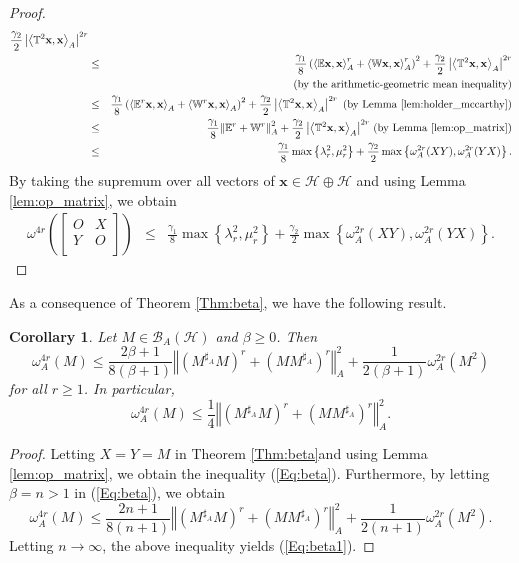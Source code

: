 \documentclass{article}
\newcommand{\bra}[1]{\left(#1\right)}
\newcommand{\seqA}[1]{{\left<#1\right>}_{A}}
\newcommand{\normA}[1]{{\left\Vert#1\right\Vert}_{A}}
\newcommand{\abs}[1]{\left\vert#1\right\vert}
\newcommand{\set}[1]{\left\{#1\right\}}
\newcommand{\hh}{\mathcal{H}\oplus\mathcal{H}}
\newcommand {\W}{\mathbb{W}}
\newcommand {\E}{\mathbb{E}}
\newcommand {\Ma}{M^{\sharp_{A}}}
\newcommand {\T}{\mathbb{T}}
\newcommand {\h}{\mathcal{H}}
\renewcommand {\b}{\mathcal{B}}
\newtheorem{corollary}[theorem]{Corollary}
\begin{document}
\begin{proof}
\begin{eqnarray*}
  \frac{\gamma_2}{2}\abs{\seqA{\T^2\mathbf{x},\mathbf{x}}}^{2r}\\
  &\leq& \frac{\gamma_1}{8}\bra{\seqA{\E\mathbf{x},\mathbf{x}}^{r}+\seqA{\W\mathbf{x},\mathbf{x}}^{r}}^2+
  \frac{\gamma_2}{2}\abs{\seqA{\T^2\mathbf{x},\mathbf{x}}}^{2r}\\
  &&\bra{\mbox{by the arithmetic-geometric mean inequality}}\\
  &\leq& \frac{\gamma_1}{8}\bra{\seqA{\E^r\mathbf{x},\mathbf{x}}
  +\seqA{\W^r\mathbf{x},\mathbf{x}}}^2+\frac{\gamma_2}{2}\abs{\seqA{\T^2\mathbf{x},\mathbf{x}}}^{2r}\,\,\bra{\mbox{by Lemma \ref{lem:holder_mccarthy}}}\\
   &\leq& \frac{\gamma_1}{8}\normA{\E^r+\W^r}^2+\frac{\gamma_2}{2}\abs{\seqA{\T^2\mathbf{x},\mathbf{x}}}^{2r}\,\bra{\mbox{by Lemma \ref{lem:op_matrix}}}\\
   &\leq&\frac{\gamma_1}{8}\max\set{\lambda_r^2,\mu_r^2}+\frac{\gamma_2}{2}\max\set{\omega_A^{2r}(XY),\omega_A^{2r}(YX)}.
   \end{eqnarray*}
By taking the supremum over all vectors of $\mathbf{x}\in\hh$ and using Lemma \ref{lem:op_matrix}, we obtain
\begin{eqnarray*}
  \omega^{4r}\bra{\begin{bmatrix} O& X\\ Y& O \\\end{bmatrix}}&\leq& \frac{\gamma_1}{8}\max\set{\lambda_r^2,\mu_r^2}+\frac{\gamma_2}{2}\max\set{\omega_A^{2r}(XY),\omega_A^{2r}(YX)}.
\end{eqnarray*}
\end{proof}
As a consequence of Theorem \ref{Thm:beta}, we have the following result.
\begin{corollary}\label{Rem:Mohd1} Let $M\in\b_A(\h)$ and $\beta\geq 0$. Then
\begin{equation}\label{Eq:beta}
\omega_A^{4r}(M)\leq \frac{2\beta+1}{8(\beta+1)}\normA{\bra{\Ma M}^r+\bra{M\Ma}^r}^2+\frac{1}{2(\beta+1)}\omega_A^{2r}(M^2)
\end{equation}
for all $r\geq 1$. In particular,
\begin{equation}\label{Eq:beta1}
\omega_A^{4r}(M)\leq \frac{1}{4}\normA{\bra{\Ma M}^r+\bra{M\Ma}^r}^2.
\end{equation}
\end{corollary}
 \begin{proof} Letting $X=Y=M$ in Theorem \ref{Thm:beta}and using Lemma \ref{lem:op_matrix}, we obtain the inequality (\ref{Eq:beta}).
 Furthermore, by letting $\beta=n>1$ in (\ref{Eq:beta}), we obtain
 $$\omega_A^{4r}(M)\leq \frac{2n+1}{8(n+1)}\normA{\bra{\Ma M}^r+\bra{M\Ma}^r}^2+\frac{1}{2(n+1)}\omega_A^{2r}(M^2).$$
 Letting $n\to\infty$, the above inequality yields (\ref{Eq:beta1}).
 \end{proof}
\end{document}
